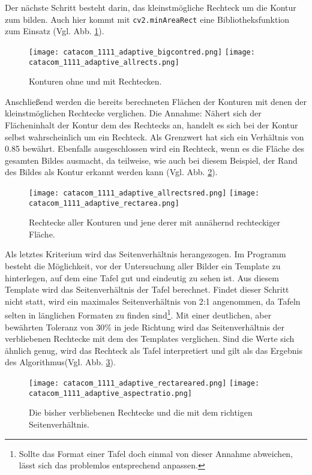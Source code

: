 Der nächste Schritt besteht darin, das kleinstmögliche Rechteck um die Kontur zum bilden. Auch hier kommt mit \verb|cv2.minAreaRect| eine Bibliotheksfunktion zum Einsatz (Vgl. Abb. \ref{fig:adaptiverectangles}).
\begin{figure}[h!]
\texttt{[image: catacom\_1111\_adaptive\_bigcontred.png]}
\texttt{[image: catacom\_1111\_adaptive\_allrects.png]}
\caption{Konturen ohne und mit Rechtecken.}
\label{fig:adaptiverectangles}
\end{figure}

Anschließend werden die bereits berechneten Flächen der Konturen mit denen der kleinstmöglichen Rechtecke verglichen. Die Annahme: Nähert sich der Flächeninhalt der Kontur dem des Rechtecks an, handelt es sich bei der Kontur selbst wahrscheinlich um ein Rechteck. Als Grenzwert hat sich ein Verhältnis von 0.85 bewährt. Ebenfalls ausgeschlossen wird ein Rechteck, wenn es die Fläche des gesamten Bildes ausmacht, da teilweise, wie auch bei diesem Beispiel, der Rand des Bildes als Kontur erkannt werden kann (Vgl. Abb. \ref{fig:adaptivrect}).
\begin{figure}[h!]
\texttt{[image: catacom\_1111\_adaptive\_allrectsred.png]}
\texttt{[image: catacom\_1111\_adaptive\_rectarea.png]}
\caption{Rechtecke aller Konturen und jene derer mit annähernd rechteckiger Fläche.}
\label{fig:adaptivrect}
\end{figure}

Als letztes Kriterium wird das Seitenverhältnis herangezogen. Im Programm besteht die Möglichkeit, vor der Untersuchung aller Bilder ein Template zu hinterlegen, auf dem eine Tafel gut und eindeutig zu sehen ist. Aus diesem Template wird das Seitenverhältnis der Tafel berechnet. Findet dieser Schritt nicht statt, wird ein maximales Seitenverhältnis von 2:1 angenommen, da Tafeln selten in länglichen Formaten zu finden sind\footnote{Sollte das Format einer Tafel doch einmal von dieser Annahme abweichen, lässt sich das problemlos entsprechend anpassen.}. Mit einer deutlichen, aber bewährten Toleranz von 30\% in jede Richtung wird das Seitenverhältnis der verbliebenen Rechtecke mit dem des Templates verglichen. Sind die Werte sich ähnlich genug, wird das Rechteck als Tafel interpretiert und gilt als das Ergebnis des Algorithmus(Vgl. Abb. \ref{fig:aspectratio}).
\begin{figure}[h!]
\texttt{[image: catacom\_1111\_adaptive\_rectareared.png]}
\texttt{[image: catacom\_1111\_adaptive\_aspectratio.png]}
\caption{Die bisher verbliebenen Rechtecke und die mit dem richtigen Seitenverhältnis.}
\label{fig:aspectratio}
\end{figure}
 
